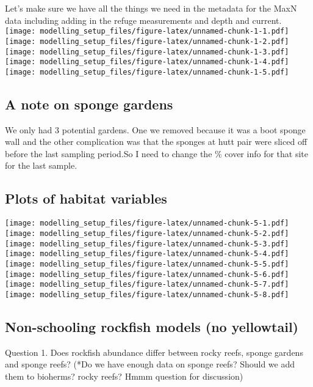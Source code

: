 \documentclass[
]{article}
\begin{document}
Let's make sure we have all the things we need in the metadata for the
MaxN data including adding in the refuge measurements and depth and
current.
\texttt{[image: modelling\_setup\_files/figure-latex/unnamed-chunk-1-1.pdf]}
\texttt{[image: modelling\_setup\_files/figure-latex/unnamed-chunk-1-2.pdf]}
\texttt{[image: modelling\_setup\_files/figure-latex/unnamed-chunk-1-3.pdf]}
\texttt{[image: modelling\_setup\_files/figure-latex/unnamed-chunk-1-4.pdf]}
\texttt{[image: modelling\_setup\_files/figure-latex/unnamed-chunk-1-5.pdf]}

\hypertarget{a-note-on-sponge-gardens}{%
\subsection{A note on sponge gardens}\label{a-note-on-sponge-gardens}}

We only had 3 potential gardens. One we removed because it was a boot
sponge wall and the other complication was that the sponges at hutt pair
were sliced off before the last sampling period.So I need to change the
\% cover info for that site for the last sample.

\hypertarget{plots-of-habitat-variables}{%
\subsection{Plots of habitat
variables}\label{plots-of-habitat-variables}}

\texttt{[image: modelling\_setup\_files/figure-latex/unnamed-chunk-5-1.pdf]}
\texttt{[image: modelling\_setup\_files/figure-latex/unnamed-chunk-5-2.pdf]}
\texttt{[image: modelling\_setup\_files/figure-latex/unnamed-chunk-5-3.pdf]}
\texttt{[image: modelling\_setup\_files/figure-latex/unnamed-chunk-5-4.pdf]}
\texttt{[image: modelling\_setup\_files/figure-latex/unnamed-chunk-5-5.pdf]}
\texttt{[image: modelling\_setup\_files/figure-latex/unnamed-chunk-5-6.pdf]}
\texttt{[image: modelling\_setup\_files/figure-latex/unnamed-chunk-5-7.pdf]}
\texttt{[image: modelling\_setup\_files/figure-latex/unnamed-chunk-5-8.pdf]}

\hypertarget{non-schooling-rockfish-models-no-yellowtail}{%
\subsection{Non-schooling rockfish models (no
yellowtail)}\label{non-schooling-rockfish-models-no-yellowtail}}

Question 1. Does rockfish abundance differ between rocky reefs, sponge
gardens and sponge reefs? (*Do we have enough data on sponge reefs?
Should we add them to bioherms? rocky reefs? Hmmm question for
discussion)
\end{document}
